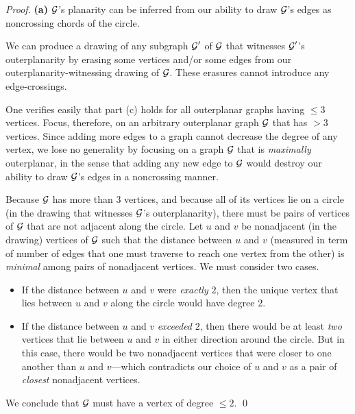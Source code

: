 \begin{proof}
{\bf (a)}
$\mbox{$\cal G$}$'s planarity can be inferred from our ability to draw $\mbox{$\cal G$}$'s edges as noncrossing chords of the circle.

\medskip

We can produce a drawing of any subgraph  $\mbox{$\cal G$}'$ of $\mbox{$\cal G$}$ that witnesses $\mbox{$\cal G$}'$'s outerplanarity by erasing some vertices and/or some edges from our outerplanarity-witnessing drawing of $\mbox{$\cal G$}$.  These erasures cannot introduce any edge-crossings.

\medskip

One verifies easily that part (c) holds for all outerplanar graphs having $\leq 3$ vertices.  Focus, therefore, on an arbitrary outerplanar graph $\mbox{$\cal G$}$ that has $> 3$ vertices.  Since adding more edges to a graph cannot decrease the degree of any vertex, we lose no generality by focusing on a graph $\mbox{$\cal G$}$ that is {\em maximally} outerplanar, in the sense that adding any new edge to $\mbox{$\cal G$}$ would destroy our ability to draw $\mbox{$\cal G$}$'s edges in a noncrossing manner.

\smallskip

Because $\mbox{$\cal G$}$ has more than $3$ vertices, and because all of its vertices lie on a circle (in the drawing that witnesses $\mbox{$\cal G$}$'s outerplanarity), there must be pairs of vertices of $\mbox{$\cal G$}$ that are not adjacent along the circle.  Let $u$ and $v$ be nonadjacent (in the drawing) vertices of $\mbox{$\cal G$}$ such 
that the distance between $u$ and $v$ (measured in term of number of edges that one must traverse to reach one vertex from the other) is {\em minimal} among pairs of nonadjacent vertices.  We must consider two cases.
\begin{itemize}
\item
If the distance between $u$ and $v$ were {\em exactly} $2$, then the unique vertex that lies between $u$ and $v$ along the circle would have degree $2$.
\item
If the distance between $u$ and $v$ {\em exceeded} $2$, then there would be at least {\em two} vertices that lie between $u$ and $v$ in either direction around the circle.  But in this case, there would be two nonadjacent vertices that were closer to one another than $u$ and $v$---which contradicts our choice of $u$ and $v$ as a pair of {\em closest} nonadjacent vertices.
\end{itemize}
We conclude that $\mbox{$\cal G$}$ must have a vertex of degree $\leq 2$.  \qed
\end{proof}

